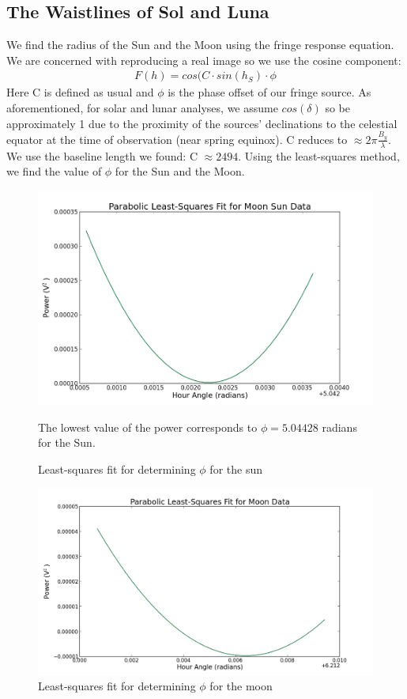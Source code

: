 \documentclass{article}
\begin{document}
\subsection{The Waistlines of Sol and Luna}
We find the radius of the Sun and the Moon using the fringe response
equation. We are concerned with reproducing a real image so we use the
cosine component:
\begin{align}F(h) = cos(C \cdot sin(h_{S}) \cdot \phi
\end{align}
Here C is defined as usual and $\phi$ is the phase offset of our fringe
source. As aforementioned, for solar and lunar analyses, we assume
$cos(\delta)$ so be approximately 1 due to the proximity of the sources'
declinations to the celestial equator at the time of observation (near
spring equinox). C reduces to $\approx 2\pi \frac{B_{y}}{\lambda}$. We
use the baseline length we found: C $\approx 2494$. Using the
least-squares method, we find the value of $\phi$ for the Sun and the
Moon. 
\begin{figure}[H]
\centering
\includegraphics[width=\textwidth]{sun_fit.png}
\caption{Least-squares fit for determining $\phi$ for the sun}
The lowest value of the power corresponds to $\phi = 5.04428$ radians
for the Sun. 
\end{figure}\begin{figure}[H]
\centering
\includegraphics[width=\textwidth]{moon_fit.png}
\caption{Least-squares fit for determining $\phi$ for the moon}
\end{figure}
\end{document}
